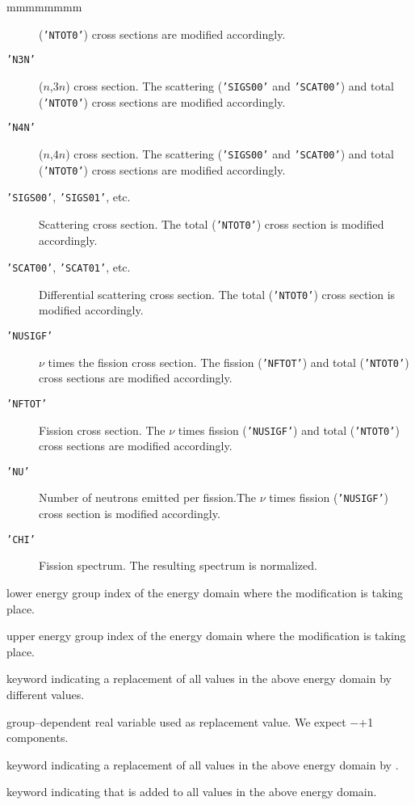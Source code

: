 \begin{ListeDeDescription}{mmmmmmmm}
\begin{description}
({\tt 'NTOT0'}) cross sections are modified accordingly.
\item[{\tt 'N3N'}] ($n$,$3n$) cross section. The scattering ({\tt 'SIGS00'} and {\tt 'SCAT00'}) and total
({\tt 'NTOT0'}) cross sections are modified accordingly.
\item[{\tt 'N4N'}] ($n$,$4n$) cross section. The scattering ({\tt 'SIGS00'} and {\tt 'SCAT00'}) and total
({\tt 'NTOT0'}) cross sections are modified accordingly.
\item[{\tt 'SIGS00'}, {\tt 'SIGS01'}, etc.] Scattering cross section. The total ({\tt 'NTOT0'}) cross section is modified accordingly.
\item[{\tt 'SCAT00'}, {\tt 'SCAT01'}, etc.] Differential scattering cross section. The total ({\tt 'NTOT0'}) cross section is modified accordingly.
\item[{\tt 'NUSIGF'}] $\nu$ times the fission cross section. The fission ({\tt 'NFTOT'}) and total ({\tt 'NTOT0'}) cross sections are modified accordingly.
\item[{\tt 'NFTOT'}] Fission cross section. The $\nu$ times fission ({\tt 'NUSIGF'}) and total ({\tt 'NTOT0'}) cross sections are modified accordingly.
\item[{\tt 'NU'}] Number of neutrons emitted per fission.The $\nu$ times fission ({\tt 'NUSIGF'}) cross section is modified accordingly.
\item[{\tt 'CHI'}] Fission spectrum. The resulting spectrum is normalized.
\end{description}

\item[\dusa{igm}] lower energy group index of the energy domain where the modification is taking place.

\item[\dusa{igp}] upper energy group index of the energy domain where the modification is taking place.

\item[\moc{VALE}] keyword indicating a replacement of all values in the above energy domain by different values.

\item[\dusa{val}] group--dependent real variable used as replacement value. We expect $-$$+$1 components.

\item[\moc{CONS}] keyword indicating a replacement of all values in the above energy domain by .

\item[\moc{PLUS}] keyword indicating that  is added to all values in the above energy domain.


\end{ListeDeDescription}
